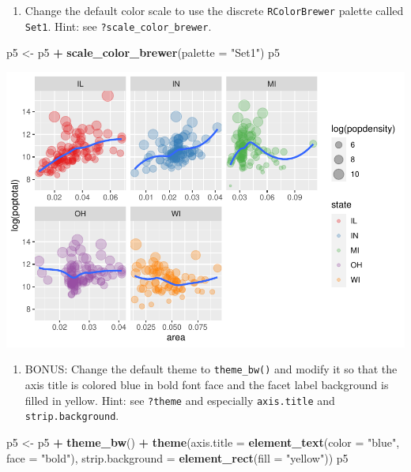 \documentclass[
]{book}
\newenvironment{Shaded}{\begin{snugshade}}{\end{snugshade}}
\newcommand{\DataTypeTok}[1]{\textcolor[rgb]{0.13,0.29,0.53}{#1}}
\newcommand{\KeywordTok}[1]{\textcolor[rgb]{0.13,0.29,0.53}{\textbf{#1}}}
\newcommand{\NormalTok}[1]{#1}
\newcommand{\OperatorTok}[1]{\textcolor[rgb]{0.81,0.36,0.00}{\textbf{#1}}}
\newcommand{\StringTok}[1]{\textcolor[rgb]{0.31,0.60,0.02}{#1}}
\providecommand{\tightlist}{%
  \setlength{\itemsep}{0pt}\setlength{\parskip}{0pt}}
\begin{document}
\begin{enumerate}
\def\labelenumi{\arabic{enumi}.}
\setcounter{enumi}{4}
\tightlist
\item
  Change the default color scale to use the discrete \texttt{RColorBrewer} palette called \texttt{Set1}. Hint: see \texttt{?scale\_color\_brewer}.
\end{enumerate}

\begin{Shaded}
\begin{Highlighting}[]
\NormalTok{p5 \textless{}{-}}\StringTok{ }\NormalTok{p5 }\OperatorTok{+}\StringTok{ }\KeywordTok{scale\_color\_brewer}\NormalTok{(}\DataTypeTok{palette =} \StringTok{"Set1"}\NormalTok{)}
\NormalTok{p5}
\end{Highlighting}
\end{Shaded}

\includegraphics{R/Rgraphics/figures/unnamed-chunk-232-1.pdf}

\begin{enumerate}
\def\labelenumi{\arabic{enumi}.}
\setcounter{enumi}{5}
\tightlist
\item
  BONUS: Change the default theme to \texttt{theme\_bw()} and modify it so that the axis title is colored blue in bold font face and the facet label background is filled in yellow. Hint: see \texttt{?theme} and especially \texttt{axis.title} and \texttt{strip.background}.
\end{enumerate}

\begin{Shaded}
\begin{Highlighting}[]
\NormalTok{p5 \textless{}{-}}\StringTok{ }\NormalTok{p5 }\OperatorTok{+}\StringTok{ }\KeywordTok{theme\_bw}\NormalTok{() }\OperatorTok{+}
\StringTok{    }\KeywordTok{theme}\NormalTok{(}\DataTypeTok{axis.title =} \KeywordTok{element\_text}\NormalTok{(}\DataTypeTok{color =} \StringTok{"blue"}\NormalTok{, }\DataTypeTok{face =} \StringTok{"bold"}\NormalTok{),}
          \DataTypeTok{strip.background =} \KeywordTok{element\_rect}\NormalTok{(}\DataTypeTok{fill =} \StringTok{"yellow"}\NormalTok{))}
\NormalTok{p5}
\end{Highlighting}
\end{Shaded}
\end{document}
